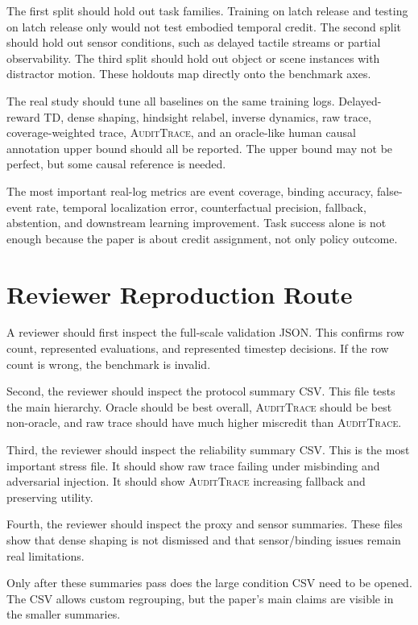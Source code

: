 \documentclass{article}
\newcommand{\method}{\textsc{AuditTrace}\xspace}
\begin{document}
The first split should hold out task families. Training on latch release and testing on latch release only would not test embodied temporal credit. The second split should hold out sensor conditions, such as delayed tactile streams or partial observability. The third split should hold out object or scene instances with distractor motion. These holdouts map directly onto the benchmark axes.

The real study should tune all baselines on the same training logs. Delayed-reward TD, dense shaping, hindsight relabel, inverse dynamics, raw trace, coverage-weighted trace, \method, and an oracle-like human causal annotation upper bound should all be reported. The upper bound may not be perfect, but some causal reference is needed.

The most important real-log metrics are event coverage, binding accuracy, false-event rate, temporal localization error, counterfactual precision, fallback, abstention, and downstream learning improvement. Task success alone is not enough because the paper is about credit assignment, not only policy outcome.

\section{Reviewer Reproduction Route}

A reviewer should first inspect the full-scale validation JSON. This confirms row count, represented evaluations, and represented timestep decisions. If the row count is wrong, the benchmark is invalid.

Second, the reviewer should inspect the protocol summary CSV. This file tests the main hierarchy. Oracle should be best overall, \method should be best non-oracle, and raw trace should have much higher miscredit than \method.

Third, the reviewer should inspect the reliability summary CSV. This is the most important stress file. It should show raw trace failing under misbinding and adversarial injection. It should show \method increasing fallback and preserving utility.

Fourth, the reviewer should inspect the proxy and sensor summaries. These files show that dense shaping is not dismissed and that sensor/binding issues remain real limitations.

Only after these summaries pass does the large condition CSV need to be opened. The CSV allows custom regrouping, but the paper's main claims are visible in the smaller summaries.
\end{document}
